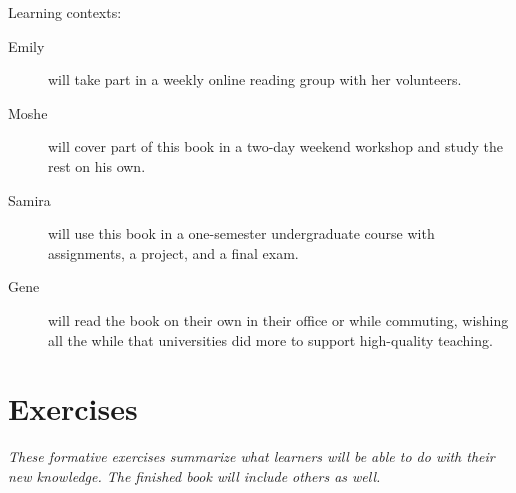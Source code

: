 Learning contexts:

\begin{description}
\item[Emily]
will take part in a weekly online reading group with her volunteers.
\item[Moshe]
will cover part of this book in a two-day weekend workshop and study
the rest on his own.
\item[Samira]
will use this book in a one-semester undergraduate course with
assignments, a project, and a final exam.
\item[Gene]
will read the book on their own in their office or while commuting,
wishing all the while that universities did more to support
high-quality teaching.
\end{description}

\section{Exercises}\label{s:v3-exercises}

\emph{These formative exercises summarize what learners will be able to do
with their new knowledge. The finished book will include others as
well.}

